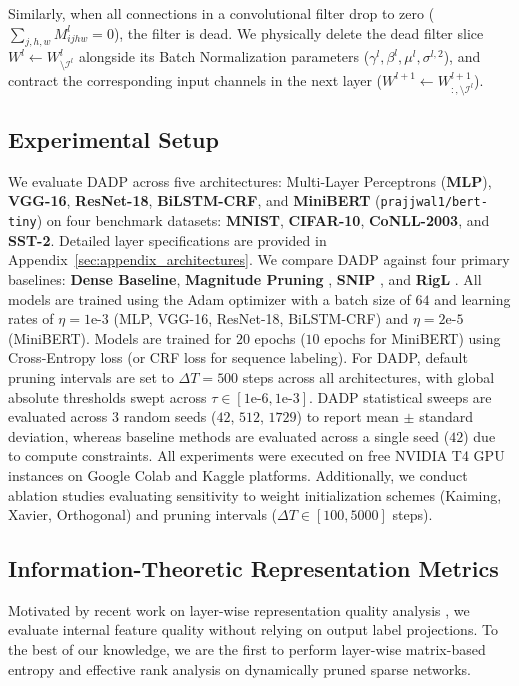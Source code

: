 Similarly, when all connections in a convolutional filter drop to zero ($\sum_{j,h,w} M_{ijhw}^l = 0$), the filter is dead. We physically delete the dead filter slice $W^l \leftarrow W^l_{\setminus \mathcal{I}^l}$ alongside its Batch Normalization parameters ($\gamma^l, \beta^l, \mu^l, \sigma^{l, 2}$), and contract the corresponding input channels in the next layer ($W^{l+1} \leftarrow W^{l+1}_{:, \setminus \mathcal{I}^l}$).

\subsection{Experimental Setup}

We evaluate DADP across five architectures: Multi-Layer Perceptrons (\textbf{MLP}), \textbf{VGG-16}, \textbf{ResNet-18}, \textbf{BiLSTM-CRF}, and \textbf{MiniBERT} (\texttt{prajjwal1/bert-tiny}) on four benchmark datasets: \textbf{MNIST}, \textbf{CIFAR-10}, \textbf{CoNLL-2003}, and \textbf{SST-2}. Detailed layer specifications are provided in Appendix~\ref{sec:appendix_architectures}. We compare DADP against four primary baselines: \textbf{Dense Baseline}, \textbf{Magnitude Pruning} \citep{han2015learning}, \textbf{SNIP} \citep{lee2019snip}, and \textbf{RigL} \citep{evci2020rigging}. All models are trained using the Adam optimizer with a batch size of $64$ and learning rates of $\eta = 1\text{e-}3$ (MLP, VGG-16, ResNet-18, BiLSTM-CRF) and $\eta = 2\text{e-}5$ (MiniBERT). Models are trained for $20$ epochs ($10$ epochs for MiniBERT) using Cross-Entropy loss (or CRF loss for sequence labeling). For DADP, default pruning intervals are set to $\Delta T = 500$ steps across all architectures, with global absolute thresholds swept across $\tau \in [1\text{e-}6, 1\text{e-}3]$. DADP statistical sweeps are evaluated across $3$ random seeds ($42$, $512$, $1729$) to report mean $\pm$ standard deviation, whereas baseline methods are evaluated across a single seed ($42$) due to compute constraints. All experiments were executed on free NVIDIA T4 GPU instances on Google Colab and Kaggle platforms. Additionally, we conduct ablation studies evaluating sensitivity to weight initialization schemes (Kaiming, Xavier, Orthogonal) and pruning intervals ($\Delta T \in [100, 5000]$ steps).

\subsection{Information-Theoretic Representation Metrics}

Motivated by recent work on layer-wise representation quality analysis \citep{skean2025layer}, we evaluate internal feature quality without relying on output label projections. To the best of our knowledge, we are the first to perform layer-wise matrix-based entropy and effective rank analysis on dynamically pruned sparse networks.

